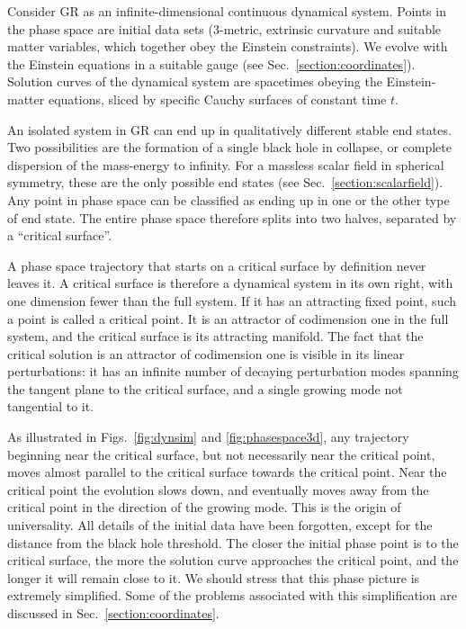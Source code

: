 \documentclass{article}
\begin{document}
Consider GR as an infinite-dimensional continuous dynamical
system. Points in the phase space are initial data
sets (3-metric, extrinsic curvature and suitable matter variables,
which together obey the Einstein constraints). We evolve with the Einstein
equations in a suitable gauge (see
Sec.~\ref{section:coordinates}). Solution curves of the dynamical
system are spacetimes obeying the Einstein-matter equations, sliced by
specific Cauchy surfaces of constant time $t$.

An isolated system in GR can end up in qualitatively different stable
end states. Two possibilities are the formation of a single
black hole in collapse, or complete dispersion of the mass-energy to
infinity. For a massless scalar field in spherical symmetry, these
are the only possible end states (see
Sec.~\ref{section:scalarfield}). Any point in phase space can be
classified as ending up in one or the other type of end state. The
entire phase space therefore splits into two halves, separated by a
``critical surface''.

A phase space trajectory that starts on a critical surface by
definition never leaves it. A critical surface is therefore a
dynamical system in its own right, with one dimension fewer than the
full system. If it has an attracting fixed point, such a point is
called a critical point. It is an attractor of codimension one in the
full system, and the critical surface is its attracting manifold. The
fact that the critical solution is an attractor of codimension one is
visible in its linear perturbations: it has an infinite number of
decaying perturbation modes spanning the tangent plane to the critical
surface, and a single growing mode not tangential to it.

As illustrated in Figs.~\ref{fig:dynsim} and \ref{fig:phasespace3d},
any trajectory beginning near the critical surface, but not
necessarily near the critical point, moves almost parallel to the
critical surface towards the critical point. Near the critical point
the evolution slows down, and eventually moves away from the critical
point in the direction of the growing mode. This is the origin of
universality. All details of the initial data have been forgotten,
except for the distance from the black hole threshold. The closer the
initial phase point is to the critical surface, the more the solution
curve approaches the critical point, and the longer it will remain
close to it.  We should stress that this phase picture is extremely
simplified.  Some of the problems associated with this simplification
are discussed in Sec.~\ref{section:coordinates}.
\end{document}
